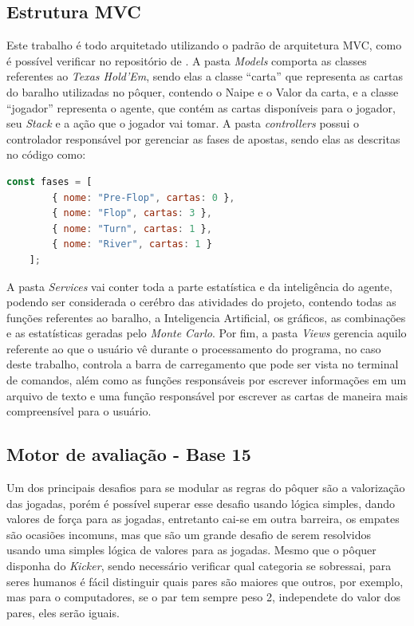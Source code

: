 \subsection{Estrutura \texorpdfstring{\gls{MVC}}{MVC}}
Este trabalho é todo arquitetado utilizando o padrão de arquitetura \gls{MVC}, como é possível verificar no repositório de . A pasta \textit{Models} comporta as classes referentes ao \textit{Texas Hold'Em}, sendo elas a classe ``carta'' que representa as cartas do baralho utilizadas no pôquer, contendo o Naipe e o Valor da carta, e a classe ``jogador'' representa o agente, que contém as cartas disponíveis para o jogador, seu \textit{Stack} e a ação que o jogador vai tomar.
A pasta \textit{controllers} possui o controlador responsável por gerenciar as fases de apostas, sendo elas as descritas no código como:
\begin{lstlisting}[language=JavaScript, caption={Fases gerenciadas pelo jogoController.js}, label={cod:fases}]
const fases = [
        { nome: "Pre-Flop", cartas: 0 },
        { nome: "Flop", cartas: 3 },
        { nome: "Turn", cartas: 1 },
        { nome: "River", cartas: 1 }
    ];
\end{lstlisting}
A pasta \textit{Services} vai conter toda a parte estatística e da inteligência do agente, podendo ser considerada o cerébro das atividades do projeto, contendo todas as funções referentes ao baralho, a Inteligencia Artificial, os gráficos, as combinações e as estatísticas geradas pelo \textit{Monte Carlo}.
Por fim, a pasta \textit{Views} gerencia aquilo referente ao que o usuário vê durante o processamento do programa, no caso deste trabalho, controla a barra de carregamento que pode ser vista no terminal de comandos, além como as funções responsáveis por escrever informações em um arquivo de texto e uma função responsável por escrever as cartas de maneira mais compreensível para o usuário.

\subsection{Motor de avaliação - Base 15}

Um dos principais desafios para se modular as regras do pôquer são a valorização das jogadas, porém é possível superar esse desafio usando lógica simples, dando valores de força para as jogadas, entretanto cai-se em outra barreira, os empates são ocasiões incomuns, mas que são um grande desafio de serem resolvidos usando uma simples lógica de valores para as jogadas. Mesmo que o pôquer disponha do \textit{Kicker}, sendo necessário verificar qual categoria se sobressai, para seres humanos é fácil distinguir quais pares são maiores que outros, por exemplo, mas para o computadores, se o par tem sempre peso 2, independete do valor dos pares, eles serão iguais.

